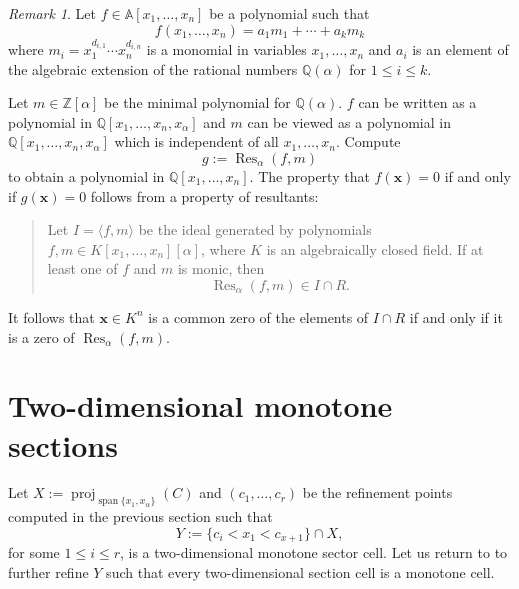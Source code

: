 \documentclass[
]{book}
\theoremstyle{definition}
\theoremstyle{definition}
\theoremstyle{definition}
\theoremstyle{definition}
\theoremstyle{remark}
\newtheorem*{remark}{Remark}
\begin{document}
\begin{remark}

Let \(f \in \mathbb{A}[x_1,\ldots,x_n]\) be a polynomial such that
\[
f(x_1,\ldots,x_n) = a_1 m_1 + \cdots + a_k m_k
\]
where \(m_i = x_1^{d_{i,1}} \cdots x_n^{d_{i,n}}\) is a monomial in variables \(x_1,\ldots,x_n\) and \(a_i\) is an element of the algebraic extension of the rational numbers \(\mathbb{Q}(\alpha)\) for \(1 \le i \le k\).

Let \(m \in \mathbb{Z}[\alpha]\) be the minimal polynomial for \(\mathbb{Q}(\alpha)\). \(f\) can be written as a polynomial in \(\mathbb{Q}[x_1,\ldots,x_n,x_\alpha]\) and \(m\) can be viewed as a polynomial in \(\mathbb{Q}[x_1,\ldots,x_n,x_\alpha]\) which is independent of all \(x_1,\ldots,x_n\). Compute
\[
g := \operatorname{Res}_\alpha (f,m)
\]
to obtain a polynomial in \(\mathbb{Q}[x_1,\ldots,x_n]\). The property that \(f(\mathbf{x}) = 0\) if and only if \(g(\mathbf{x}) = 0\) follows from a property of resultants:

\begin{quote}
Let \(I = \langle f, m \rangle\) be the ideal generated by polynomials \(f, m \in K[x_1,\ldots,x_n][\alpha]\), where \(K\) is an algebraically closed field.
If at least one of \(f\) and \(m\) is monic, then
\[
\operatorname{Res}_\alpha (f,m) \in I \cap R.
\]
\end{quote}

It follows that \(\mathbf{x} \in K^n\) is a common zero of the elements of \(I \cap R\) if and only if it is a zero of \(\operatorname{Res}_\alpha(f,m)\).

\end{remark}

\hypertarget{sec:monotone-sections}{%
\section{Two-dimensional monotone sections}\label{sec:monotone-sections}}

Let \(X := {\operatorname{proj}_{{\operatorname{span} \{x_1,x_\alpha\}}}}(C)\) and \((c_1,\ldots,c_r)\) be the refinement points computed in the previous section such that
\[
Y := \{ c_i < x_1 < c_{x+1}\} \cap X,
\]
for some \(1 \le i \le r\), is a two-dimensional monotone sector cell.
Let us return to \citep[Theorem 3.18]{bgv15} to further refine \(Y\) such that every two-dimensional section cell is a monotone cell.
\end{document}

